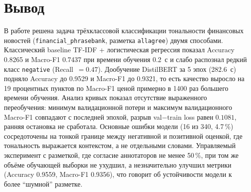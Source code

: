 \documentclass[14pt,a4paper]{extarticle}
\begin{document}
\section{Вывод}

В работе решена задача трёхклассовой классификации тональности финансовых новостей
(\texttt{financial\_phrasebank}, разметка \texttt{allagree}) двумя способами.
Классический baseline TF-IDF + логистическая регрессия показал Accuracy 0.8265 и
Macro-F1 0.7437 при времени обучения 0.2~с и слабо распознал редкий класс
\texttt{negative} (Recall~$=0.47$). Дообучение DistilBERT за 5 эпох (282.6~с)
подняло Accuracy до 0.9529 и Macro-F1 до 0.9321, то есть качество выросло на
19 процентных пунктов по Macro-F1 ценой примерно в 1400 раз большего времени
обучения. Анализ кривых показал отсутствие выраженного переобучения: минимум
валидационной потери и максимум валидационного Macro-F1 совпадают с последней
эпохой, разрыв val$-$train loss равен $0.1081$, ранняя остановка не сработала.
Основные ошибки модели (16 из 340, 4.7\,\%) сосредоточены на тонкой границе
между негативной и позитивной оценкой, где тональность выражается контекстом, а не
отдельными словами. Управляемый эксперимент с разметкой, где согласие аннотаторов
не менее 50\,\%, при том же объёме обучающей выборки не ухудшил, а незначительно
улучшил метрики (Accuracy 0.9559, Macro-F1 0.9356), что говорит об устойчивости
модели к более ``шумной'' разметке.
\end{document}
